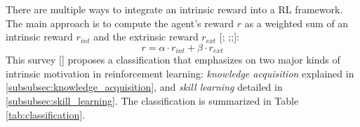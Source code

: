 \documentclass[conference]{IEEEtran}
\begin{document}
There are multiple ways to integrate an intrinsic reward into a RL framework. The main approach is to compute the agent’s reward $r$ as a weighted sum
of an intrinsic reward $r_{int}$ and the extrinsic reward $r_{ext}$ [\cite{burda2018exploration}; \cite{gregor2016variational};\cite{vezhnevets2017feudal};\cite{huang2019learning}]:
\begin{equation*}
r = \alpha \cdot r_{int} + \beta \cdot r_{ext}
\end{equation*}
This survey [\cite{aubret2019survey}] proposes a classification that emphasizes on two major kinds of intrinsic motivation in reinforcement learning: \textit{knowledge acquisition} explained in \ref{subsubsec:knowledge_acquisition}, and \textit{skill learning} detailed in \ref{subsubsec:skill_learning}. The classification is summarized in Table \ref{tab:classification}.
\end{document}
